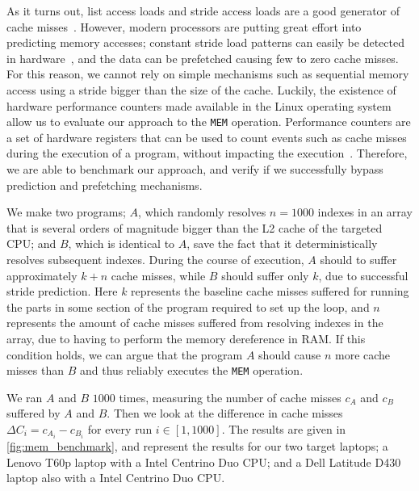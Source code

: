 As it turns out, list access loads and stride access loads are a good generator of cache misses~\cite{DBLP:conf/micro/OzawaKN95}.
However, modern processors are putting great effort into predicting memory accesses; constant stride load patterns can easily be detected in hardware~\cite{DBLP:journals/taco/LeeKV12}, and the data can be prefetched causing few to zero cache misses.
For this reason, we cannot rely on simple mechanisms such as sequential memory access using a stride bigger than the size of the cache.
Luckily, the existence of hardware performance counters made available in the Linux operating system allow us to evaluate our approach to the \texttt{MEM} operation. 
Performance counters are a set of hardware registers that can be used to count events such as cache misses during the execution of a program, without impacting the execution~\cite{url:perf_wiki}.
Therefore, we are able to benchmark our approach, and verify if we successfully bypass prediction and prefetching mechanisms.

We make two programs; \(A\), which randomly resolves \(n = 1000\) indexes in an array that is several orders of magnitude bigger than the L2 cache of the targeted \gls{CPU}; and \(B\), which is identical to \(A\), save the fact that it deterministically resolves subsequent indexes.
During the course of execution, \(A\) should to suffer approximately \(k+n\) cache misses, while \(B\) should suffer only \(k\), due to successful stride prediction.
Here \(k\) represents the baseline cache misses suffered for running the parts in some section of the program required to set up the loop, and \(n\) represents the amount of cache misses suffered from resolving indexes in the array, due to having to perform the memory dereference in RAM.
If this condition holds, we can argue that the program \(A\) should cause \(n\) more cache misses than \(B\) and thus reliably executes the \texttt{MEM} operation. 

We ran \(A\) and \(B\) \(1000\) times, measuring the number of cache misses \(c_A\) and \(c_B\) suffered by \(A\) and \(B\).
Then we look at the difference in cache misses \(\Delta C_i = c_{A_i} - c_{B_i}\) for every run \(i \in [1, 1000]\).
The results are given in \autoref{fig:mem_benchmark}, and represent the results for our two target laptops; a Lenovo T60p laptop with a Intel Centrino Duo \gls{CPU}; and a Dell Latitude D430 laptop also with a Intel Centrino Duo \gls{CPU}.

